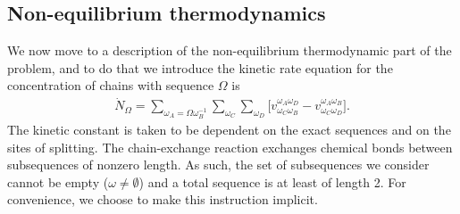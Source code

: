 \documentclass[
	amsmath,
	amssymb,
	a4paper,
	aip,		%
	jcp,		%
	reprint, twocolumn  %
	fleqn,
	showpacs,
	floatfix
]{revtex4-1}
\begin{document}
\subsection{Non-equilibrium thermodynamics}
\label{subsec: NEQTD}

We now move to a description of the non-equilibrium thermodynamic part of the problem, and to
do that we introduce the kinetic rate equation for the concentration of 
chains with sequence $\Omega$ is 
\begin{equation}
	\begin{split}
\dot{N}_{\Omega} = \sum_{\omega_{A}=\Omega \omega_{B}^{-1}} \sum_{\omega_{C}} \sum_{\omega_{D}} \bigg[ v^{\omega_{A} \omega_{D}}_{\omega_{C} \omega_{B}} -  v^{\omega_{A} \omega_{B}}_{\omega_{C} \omega_{D}}  \bigg].
\end{split}
\label{eqevol}
\end{equation} 
The kinetic constant is taken to be dependent on the exact sequences and on the sites of splitting. The chain-exchange reaction exchanges chemical bonds 
between subsequences of nonzero length. As such, the set of subsequences we consider cannot be empty ($\omega \neq \emptyset $) and a total sequence 
is at least of length 2. For convenience, we choose to make this instruction implicit.
\end{document}
